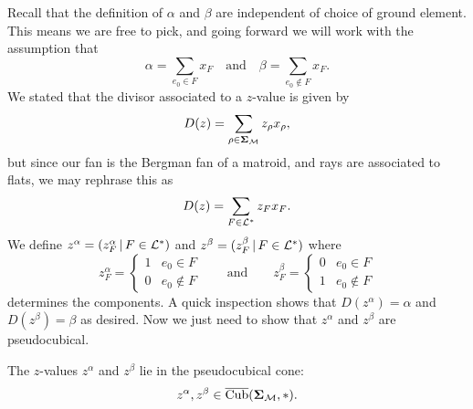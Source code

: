 \documentclass[12pt,oneside]{../../sfsuthesis}
\begin{document}
Recall that the definition of \( \alpha \) and \( \beta \) are independent of choice of ground element.
This means we are free to pick, and going forward we will work with the assumption that
\[
    \alpha = \sum_{e_0 \in F} x_F \quad \text{and} \quad \beta = \sum_{e_0 \notin F} x_F.
\]
We stated that the divisor associated to a \( z \)-value is given by
\[
    D(z) = \sum_{\rho \in {\bm{\Sigma}}_{\mathcal{M}}} z_\rho x_\rho,
\]
but since our fan is the Bergman fan of a matroid, and rays are associated to flats, we may rephrase this as
\[
    D(z) = \sum_{F \in \mathcal{L}^\ast} z_F x_F.
\]
We define \( z^\alpha = (z^\alpha_F \, | \, F \in \mathcal{L}^\ast) \) and \( z^\beta = (z^\beta_F \, | \, F \in \mathcal{L}^\ast) \) where
\[
    z^\alpha_F = \begin{cases}
        1 & e_0 \in F    \\
        0 & e_0 \notin F
    \end{cases}
    \quad \quad \text{and} \quad \quad
    z^\beta_F= \begin{cases}
        0 & e_0 \in F    \\
        1 & e_0 \notin F
    \end{cases}
\]
determines the components.
A quick inspection shows that \( D(z^\alpha) = \alpha \) and \( D(z^\beta) = \beta \) as desired.
Now we just need to show that \( z^\alpha \) and \( z^\beta \) are pseudocubical.
\begin{proposition}
    The \( z \)-values \(  z^\alpha \) and \( z^\beta \) lie in the pseudocubical cone:
    \[
        z^\alpha, z^\beta \in  \operatorname{\overline{Cub}}({\bm{\Sigma}}_{\mathcal{M}}, \ast).
    \]
\end{proposition}
\end{document}
